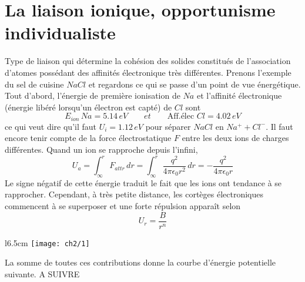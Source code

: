 \section{La liaison ionique, opportunisme individualiste}
Type de liaison qui détermine la cohésion des solides constitués de l'association d'atomes possédant des affinités électronique très différentes. Prenons l'exemple du sel de cuisine $NaCl$ et regardons ce qui se passe d'un point de vue énergétique. Tout d'abord, l'énergie de première ionisation de $Na$ et l'affinité électronique (énergie libéré lorsqu'un électron est capté) de $Cl$ sont
\begin{equation}
	E_{ion}\, Na= 5.14 \, eV \qquad et \qquad \mbox{Aff.élec } Cl = 4.02 \, eV 
\end{equation}	 
ce qui veut dire qu'il faut $U_i = 1.12\, eV$ pour séparer $NaCl$ en $Na^++Cl^-$. Il faut encore tenir compte de la force électrostatique $F$ entre les deux ions de charges différentes. Quand un ion se rapproche depuis l'infini, 
\begin{equation}
	U_a = \int _\infty ^r F_{attr} \, dr= \int _\infty ^r \frac{q^2}{4\pi \epsilon _0 r^2} \, dr = -\frac{q^2}{4\pi \epsilon _0 r}
\end{equation}
Le signe négatif de cette énergie traduit le fait que les ions ont tendance à se rapprocher. Cependant, à très petite distance, les cortèges électroniques commencent à se superposer et une forte répulsion apparaît selon 
\begin{equation}
	U_r = \frac{B}{r^n}
\end{equation}
\begin{wrapfigure}[5]{l}{6.5cm}
	\vspace{-5mm}
	\texttt{[image: ch2/1]}
\end{wrapfigure}
La somme de toutes ces contributions donne la courbe d'énergie potentielle suivante. 
A SUIVRE
